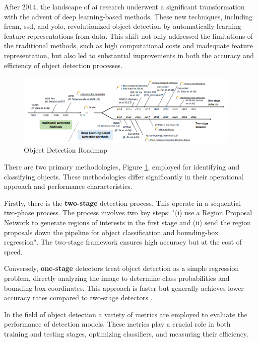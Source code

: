 After 2014, the landscape of \ac{ai} research underwent a significant transformation with the advent of deep learning-based methods. These new techniques, including \ac{frcnn}, \ac{ssd}, and \ac{yolo}, revolutionized object detection by automatically learning feature representations from data. This shift not only addressed the limitations of the traditional methods, such as high computational costs and inadequate feature representation, but also led to substantial improvements in both the accuracy and efficiency of object detection processes.

\begin{figure}[h]
    \centering 
    \includegraphics[width=0.97\textwidth]{figs/roadmap-stage.png} 
    \caption{Object Detection Roadmap~\cite{rfc22}}
    \label{fig:stage-detectors}
\end{figure}

There are two primary methodologies, Figure \ref{fig:stage-detectors}, employed for identifying and classifying objects. These methodologies differ significantly in their operational approach and performance characteristics.

Firstly, there is the \textbf{two-stage} detection process. This operate in a sequential two-phase process. The process involves two key steps: "(i) use a Region Proposal Network to generate regions of interests in the first stage and (ii) send the region proposals down the pipeline for object classification and bounding-box regression"\cite{rfc21}. The two-stage framework ensures high accuracy but at the cost of speed.

Conversely, \textbf{one-stage} detectors treat object detection as a simple regression problem, directly analyzing the image to determine class probabilities and bounding box coordinates. This approach is faster but generally achieves lower accuracy rates compared to two-stage detectors \cite{rfc23}.

In the field of object detection a variety of metrics are employed to evaluate the performance of detection models. These metrics play a crucial role in both training and testing stages, optimizing classifiers, and measuring their efficiency. 

